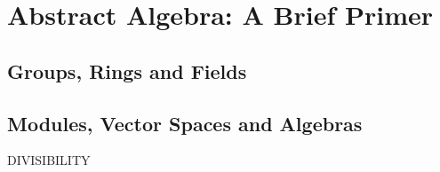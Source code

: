 \section{Abstract Algebra: A Brief Primer}

\subsection{Groups, Rings and Fields}

\lipsum[1-3]


\lipsum[1-5]


\lipsum[3-5]

\subsection{Modules, Vector Spaces and Algebras}
\lipsum[1-2]


\lipsum[1-5]


\lipsum[1-2]


\lipsum[1-3]


\lipsum[1-2]

DIVISIBILITY
\lipsum[1-3]


\lipsum[1-5]
